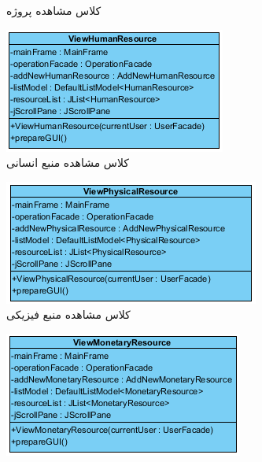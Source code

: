 \begin{figure}[H]
\begin{subfigure}[b]{0.4\textwidth}
		\caption{کلاس مشاهده پروژه}
	\end{subfigure}
\hfill
	\begin{subfigure}[b]{0.4\textwidth}
		\includegraphics[width=\textwidth]{img/class-design/ui/ViewHumanResource}
		\caption{کلاس مشاهده منبع انسانی}
	\end{subfigure}
	\hfill
	\begin{subfigure}[b]{0.4\textwidth}
		\includegraphics[width=\textwidth]{img/class-design/ui/ViewPhysicalResource}
		\caption{کلاس مشاهده منبع فیزیکی}
	\end{subfigure}
	\hfill
	\begin{subfigure}[b]{0.4\textwidth}
		\includegraphics[width=\textwidth]{img/class-design/ui/ViewMonetaryResource}

\end{subfigure}
\end{figure}
